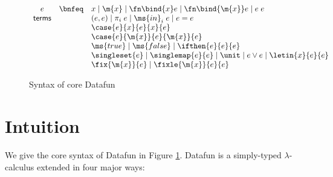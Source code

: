 \documentclass[preprint]{sigplanconf}
\renewcommand{\pipe}{\mathrel{\mid}} %
\begin{document}
\begin{figure}
\[\begin{array}{ccl}
    e &\bnfeq& x \pipe \m{x} \pipe \fn\bind{x} e \pipe \fn\bind{\m{x}} e
    \pipe e\;e\\
    \textsf{terms}
    && (e,e) \pipe \pi_i\;e \pipe \ms{in}_i\;e \pipe e = e\\
    && \case{e}{x}{e}{x}{e}\\
    && \case{e}{\m{x}}{e}{\m{x}}{e}\\
    && \ms{true} \pipe \ms{false} \pipe \ifthen{e}{e}{e}\\
    && \singleset{e} \pipe \singlemap{e}{e}
       \pipe \unit \pipe e \vee e \pipe \letin{x}{e}{e}\\
    && \fix{\m{x}}{e} \pipe \fixle{\m{x}}{e}{e}
  \end{array}\]
  \caption{Syntax of core Datafun}
  \label{fig:syntax}
\end{figure}


\section{Intuition}

We give the core syntax of Datafun in Figure \ref{fig:syntax}. Datafun is a
simply-typed $\lambda$-calculus extended in four major ways:
\end{document}
